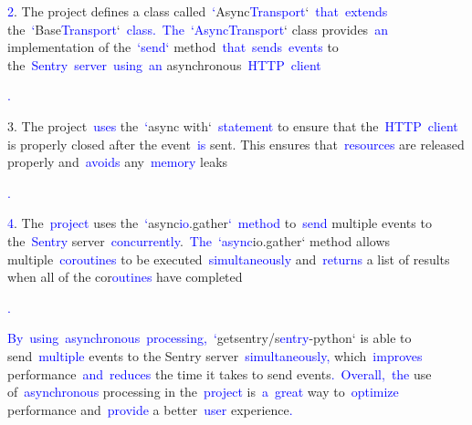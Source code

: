 \documentclass{article}
\begin{document}
\begin{tcolorbox}[colframe=black,colback=white]
{}\textcolor{blue}{2}. The project defines a class called\textcolor{blue}{~`}Async\textcolor{blue}{Transport}`\textcolor{blue}{~that}\textcolor{blue}{~extends} the\textcolor{blue}{~`}Base\textcolor{blue}{Transport}`\textcolor{blue}{~class}\textcolor{blue}{.}\textcolor{blue}{~The}\textcolor{blue}{~`}\textcolor{blue}{Async}\textcolor{blue}{Transport}` class provides\textcolor{blue}{~an} implementation of the\textcolor{blue}{~`}\textcolor{blue}{send}\textcolor{blue}{`} method\textcolor{blue}{~that}\textcolor{blue}{~sends}\textcolor{blue}{~events} to the\textcolor{blue}{~Sentry}\textcolor{blue}{~server}\textcolor{blue}{~using}\textcolor{blue}{~an} asynchronous\textcolor{blue}{~HTTP}\textcolor{blue}{~client}\textcolor{blue}{.

}3. The project\textcolor{blue}{~uses} the\textcolor{blue}{~`}async with`\textcolor{blue}{~statement} to ensure that the\textcolor{blue}{~HTTP}\textcolor{blue}{~client} is properly closed after the event\textcolor{blue}{~is} sent. This ensures that\textcolor{blue}{~resources} are released properly and\textcolor{blue}{~avoids} any\textcolor{blue}{~memory} leaks\textcolor{blue}{.

}\textcolor{blue}{4}. The\textcolor{blue}{~project} uses the\textcolor{blue}{~`}async\textcolor{blue}{io}.gather\textcolor{blue}{`}\textcolor{blue}{~method} to\textcolor{blue}{~send} multiple events to the\textcolor{blue}{~Sentry} server\textcolor{blue}{~concurrently}.\textcolor{blue}{~The}\textcolor{blue}{~`}\textcolor{blue}{async}io.gather` method allows multiple\textcolor{blue}{~cor}\textcolor{blue}{outines} to be executed\textcolor{blue}{~simultaneously} and\textcolor{blue}{~returns} a list of results when all of the cor\textcolor{blue}{outines} have completed\textcolor{blue}{.

}\textcolor{blue}{By}\textcolor{blue}{~using}\textcolor{blue}{~asynchronous}\textcolor{blue}{~processing}\textcolor{blue}{,}\textcolor{blue}{~`}getsentry/s\textcolor{blue}{entry}-python` is able to send\textcolor{blue}{~multiple} events to the Sentry server\textcolor{blue}{~simultaneously}\textcolor{blue}{,} which\textcolor{blue}{~improves} performance\textcolor{blue}{~and}\textcolor{blue}{~reduces} the time it takes to send events\textcolor{blue}{.}\textcolor{blue}{~Overall}\textcolor{blue}{,}\textcolor{blue}{~the} use of\textcolor{blue}{~asynchronous} processing in the\textcolor{blue}{~project} is\textcolor{blue}{~a}\textcolor{blue}{~great} way to\textcolor{blue}{~optimize} performance and\textcolor{blue}{~provide} a better\textcolor{blue}{~user} experience\textcolor{blue}{.}\textcolor{blue}{}
\end{tcolorbox}
\end{document}
